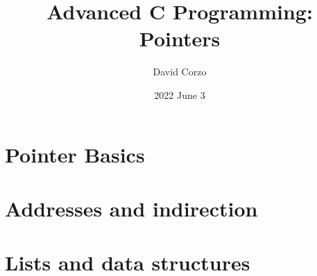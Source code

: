 \documentclass[openany]{book}
\title{Advanced C Programming: Pointers}
\date{2022 June 3}
\author{David Corzo}
\begin{document}
\maketitle
\tableofcontents

\chapter{Pointer Basics}


\chapter{Addresses and indirection}


\chapter{Lists and data structures}



\end{document}
